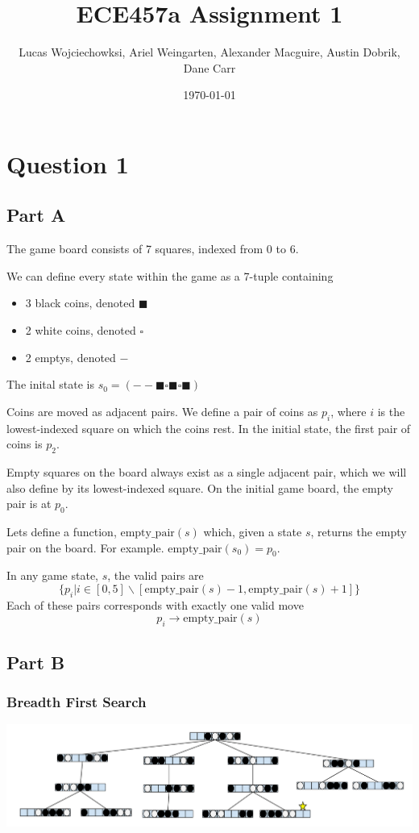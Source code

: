 \documentclass[a4paper]{article}
\title{ECE457a Assignment 1}
\author{Lucas Wojciechowksi, Ariel Weingarten, Alexander Macguire, Austin Dobrik, Dane Carr}
\date{\today}
\newcommand{\coinblack}{\blacksquare}
\newcommand{\coinwhite}{\square}
\newcommand{\coinempty}{-}
\begin{document}
\maketitle

\section{Question 1}

\subsection{Part A}

The game board consists of 7 squares, indexed from 0 to 6.

We can define every state within the game as a 7-tuple containing
\begin{itemize}
\item 3 black coins, denoted $\coinblack$
\item 2 white coins, denoted $\coinwhite$
\item 2 emptys, denoted $\coinempty$
\end{itemize}
The inital state is $s_0 = (\coinempty \coinempty \coinblack \coinwhite \coinblack \coinwhite \coinblack)$

Coins are moved as adjacent pairs. We define a pair of coins as $p_i$, where $i$ is the lowest-indexed square on which the coins rest. In the initial state, the first pair of coins is $p_2$.

Empty squares on the board always exist as a single adjacent pair, which we will also define by its lowest-indexed square. On the initial game board, the empty pair is at $p_0$.

Lets define a function, $\text{empty\_pair}(s)$ which, given a state $s$, returns the empty pair on the board. For example. $\text{empty\_pair}(s_0) = p_0$.

In any game state, $s$, the valid pairs are
$$\{p_i | i \in [0, 5] \backslash [\text{empty\_pair}(s) - 1, \text{empty\_pair}(s) + 1]\}$$
Each of these pairs corresponds with exactly one valid move
$$p_i \rightarrow \text{empty\_pair}(s)$$



\subsection{Part B}

\subsubsection{Breadth First Search}
\begin{center}
\includegraphics[width=1\textwidth]{BFS.png}
\end{center}
\end{document}
